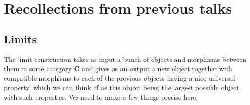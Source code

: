 \documentclass[12pt,reqno,a4paper]{amsart}
\theoremstyle{plain}
\theoremstyle{definition}
\theoremstyle{remark}
\begin{document}
\section{Recollections from previous talks}

\subsection{Limits}

The limit construction takes as input a bunch of objects and morphisms between them in some category $\mathbf{C}$ and gives as an output a new object together with compatible morphisms to each of the previous objects having a nice universal property, which we can think of as this object being the largest possible object with such properties.
We need to make a few things precise here:
\end{document}
